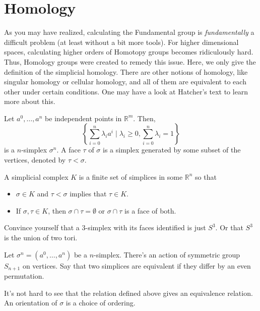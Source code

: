 \documentclass{article}
\begin{document}
\section{Homology}
As you may have realized, calculating the Fundamental group is \emph{fundamentally} a difficult problem (at least without a bit more tools). For higher dimensional spaces, calculating higher orders of Homotopy groups becomes ridiculously hard. Thus, Homology groups were created to remedy this issue. Here, we only give the definition of the simplicial homology. There are other notions of homology, like singular homology or cellular homology, and all of them are equivalent to each other under certain conditions. One may have a look at Hatcher's text to learn more about this. 

\begin{definition}
Let $a^{0}, \ldots, a^{n}$ be independent points in $\mathbb{R}^{m}$. Then, 
\[
\left\{\sum_{i = 0}^{n} \lambda_{i} a^{i}\mid \lambda_{i} \geq 0, \sum_{i = 0}^{n} \lambda_{i} = 1
\right\}
\]
is a $n$-simplex $\sigma^{n}$. A face $\tau$ of $\sigma$ is a simplex generated by some subset of the vertices, denoted by $\tau < \sigma$.  
\end{definition}

\begin{definition}
A simplicial complex $K$ is a finite set of simplices in some $\mathbb{R}^{n}$ so that 
\begin{itemize}
    \item $\sigma \in K$ and $\tau < \sigma$ implies that $\tau \in K$. 
    \item If $\sigma, \tau \in K$, then $\sigma \cap \tau = \emptyset$ or $\sigma \cap \tau$ is a face of both.  
\end{itemize}
\end{definition}

\begin{exercise}
Convince yourself that a $3$-simplex with its faces identified is just $S^3$. Or that $S^3$ is the union of two tori.
\end{exercise}

\begin{definition}
Let $\sigma^{n} = (a^{0}, \ldots, a^{n})$ be a $n$-simplex. There's an action of symmetric group $S_{n + 1}$ on vertices. Say that two simplices are equivalent if they differ by an even permutation. 
\end{definition}

\begin{remark}
It's not hard to see that the relation defined above gives an equivalence relation. An orientation of $\sigma$ is a choice of ordering.  
\end{remark}
\end{document}
